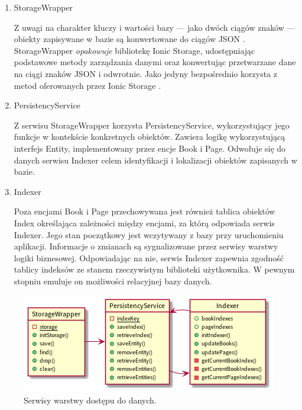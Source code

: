 \begin{enumerate}
	\item StorageWrapper

	      Z uwagi na charakter kluczy i wartości bazy — jako dwóch ciągów znaków — obiekty zapisywane w bazie są
	      konwertowane do ciągów JSON \cite{json}. StorageWrapper \textit{opakowuje} bibliotekę Ionic Storage, udostępniając podstawowe
	      metody zarządzania danymi oraz konwertując przetwarzane dane na ciągi znaków JSON i odwrotnie.
	      Jako jedyny bezpośrednio korzysta z metod oferowanych przez Ionic Storage \cite{storage}.
	\item PersistencyService

	      Z serwisu StorageWrapper korzysta PersistencyService,
	      wykorzystujący jego funkcje w kontekście konkretnych obiektów.
	      Zawiera logikę wykorzystującą interfejs Entity, implementowany przez encje Book i Page. Odwołuje się do danych
	      serwisu Indexer celem identyfikacji i lokalizacji obiektów zapisanych w bazie.
	\item Indexer

	      Poza encjami Book i Page przechowywana jest również tablica obiektów Index określająca
	      zależności między encjami, za którą odpowiada serwis Indexer.
	      Jego stan początkowy jest wczytywany z bazy przy uruchomieniu aplikacji.
	      Informacje o zmianach są sygnalizowane przez serwisy warstwy logiki biznesowej.
	      Odpowiadając na nie, serwis Indexer zapewnia zgodność tablicy indeksów ze stanem rzeczywistym
	      biblioteki użytkownika. W pewnym stopniu emuluje on możliwości relacyjnej bazy danych.
\end{enumerate}

\begin{figure}[H]
	\begin{center}
		\includegraphics[scale=0.7]{media/PersistencyLayer.png}
	\end{center}
	\caption{Serwisy warstwy dostępu do danych.}
	\label{rys:persistency-layer}
\end{figure}

